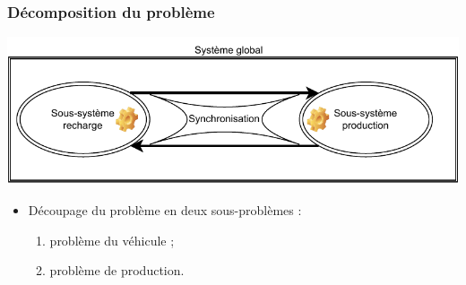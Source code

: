\documentclass[hyperref={bookmarks=false},aspectratio=169]{beamer}
\begin{document}
\begin{frame}
\frametitle{Décomposition du problème}

\begin{center}
\includegraphics[width=\textwidth]{./figures/slide_synchronisation_pb.pdf}
\end{center}
\begin{itemize}
\item Découpage du problème en deux sous-problèmes :
\begin{enumerate}
 \item  problème du véhicule ;
 \item  problème de production.
 \end{enumerate}
 \end{itemize}

\end{frame}














 


\end{document}
